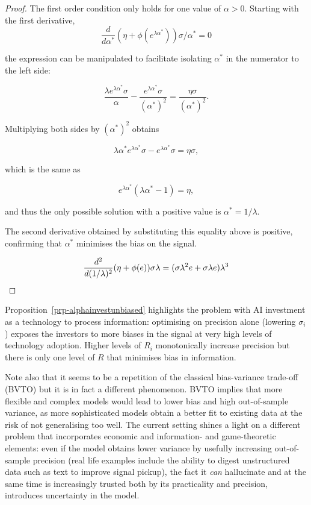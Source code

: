 \documentclass[
]{article}
\theoremstyle{plain}
\theoremstyle{remark}
\begin{document}
\begin{proof}
The first order condition only holds for one value of \(\alpha > 0\).
Starting with the first derivative, \[
\frac{d}{d \alpha^*} (\eta + \phi(e^{\lambda \alpha^*})) \sigma / \alpha^* = 0
\]

the expression can be manipulated to facilitate isolating \(\alpha^*\)
in the numerator to the left side:

\[
\frac{\lambda e^{\lambda \alpha^*} \sigma}{\alpha} - \frac{e^{\lambda \alpha^*}\sigma}{(\alpha^*)^2} = \frac{\eta \sigma}{(\alpha^*)^2}.
\]

Multiplying both sides by \((\alpha^*)^2\) obtains

\[
\lambda \alpha^* e^{\lambda \alpha^*} \sigma - e^{\lambda \alpha^*}\sigma = \eta \sigma,
\]

which is the same as

\[
e^{\lambda \alpha^*} (\lambda \alpha^* - 1)= \eta,
\]

and thus the only possible solution with a positive value is
\(\alpha^* = 1/\lambda\).

The second derivative obtained by substituting this equality above is
positive, confirming that \(\alpha^*\) minimises the bias on the signal.

\[
\frac{d^2}{d (1/\lambda)^2} (\eta + \phi(e)) \sigma \lambda = (\sigma \lambda^2 e + \sigma \lambda e)\lambda^3 \\
\]
\end{proof}

Proposition~\ref{prp-alphainvestunbiased} highlights the problem with AI
investment as a technology to process information: optimising on
precision alone (lowering \(\sigma_i\)) exposes the investors to more
biases in the signal at very high levels of technology adoption. Higher
levels of \(R_i\) monotonically increase precision but there is only one
level of \(R\) that minimises bias in information.

Note also that it seems to be a repetition of the classical
bias-variance trade-off (BVTO) but it is in fact a different phenomenon.
BVTO implies that more flexible and complex models would lead to lower
bias and high out-of-sample variance, as more sophisticated models
obtain a better fit to existing data at the risk of not generalising too
well. The current setting shines a light on a different problem that
incorporates economic and information- and game-theoretic elements: even
if the model obtains lower variance by usefully increasing out-of-sample
precision (real life examples include the ability to digest unstructured
data such as text to improve signal pickup), the fact it \emph{can}
hallucinate and at the same time is increasingly trusted both by its
practicality and precision, introduces uncertainty in the model.
\end{document}
